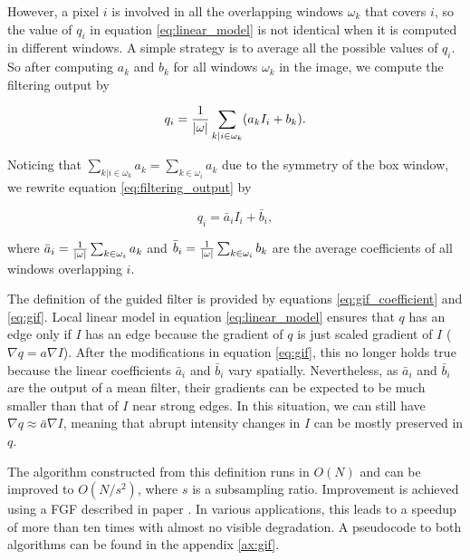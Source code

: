 {\noindent However, a pixel $i$ is involved in all the overlapping windows $\omega_{k}$ that covers $i$, so the value of $q_i$ in equation \ref{eq:linear_model} is not identical when it is computed in different windows. A simple strategy is to average all the possible values of $q_i$. So after computing $a_k$ and $b_k$ for all windows $\omega_{k}$ in the image, we compute the filtering output by

\begin{equation} \label{eq:filtering_output}
    q_{i}={1\over \vert \omega \vert } \sum_{k \vert i \in \omega_{k}}(a_{k}I_{i}+b_{k}).
\end{equation}

\noindent Noticing that $\sum_{k \vert i \in \omega_{k}}a_{k}= \sum_{k \in \omega_{i}}a_{k}$ due to the symmetry of the box window, we rewrite equation \ref{eq:filtering_output} by

\begin{equation} \label{eq:gif}
    q_{i}=\bar{a}_{i}I_{i}+\bar{b}_{i},
\end{equation}

\noindent where $\bar{a}_{i} = {1\over \vert \omega \vert} \sum_{k \in \omega_i}a_k$ and $\bar{b}_{i} = {1\over \vert \omega \vert} \sum_{k \in \omega_i}b_k$ are the average coefficients of all windows overlapping $i$.

}
\vspace{1em}

The definition of the guided filter is provided by equations \ref{eq:gif_coefficient} and \ref{eq:gif}. Local linear model in equation \ref{eq:linear_model} ensures that $q$ has an edge only if $I$ has an edge because the gradient of $q$ is just scaled gradient of $I$ ($\nabla q=a \nabla I$). After the modifications in equation \ref{eq:gif}, this no longer holds true because the linear coefficients $\bar{a}_i$ and $\bar{b}_i$ vary spatially. Nevertheless, as $\bar{a}_i$ and $\bar{b}_i$ are the output of a mean filter, their gradients can be expected to be much smaller than that of $I$ near strong edges. In this situation, we can still have $\nabla q\approx \bar a \nabla I$, meaning that abrupt intensity changes in $I$ can be mostly preserved in $q$. \cite{gif}

The algorithm constructed from this definition runs in $O(N)$ and can be improved to $O(N/s^2)$, where $s$ is a subsampling ratio. Improve\-ment is achie\-ved using a \gls{FGF} described in paper \cite{fastguided}. In various applications, this leads to a speedup of more than ten times with almost no visible degradation. A pseudocode to both algorithms can be found in the appendix \ref{ax:gif}.

